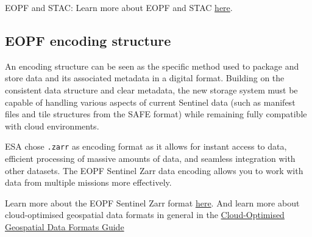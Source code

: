 \documentclass[
  letterpaper,
  DIV=11,
  numbers=noendperiod]{scrreprt}
\begin{document}
\begin{tcolorbox}[enhanced jigsaw, coltitle=black, colback=white, leftrule=.75mm, colbacktitle=quarto-callout-note-color!10!white, titlerule=0mm, title=\textcolor{quarto-callout-note-color}{\faInfo}\hspace{0.5em}{Note}, rightrule=.15mm, bottomrule=.15mm, bottomtitle=1mm, toptitle=1mm, arc=.35mm, toprule=.15mm, left=2mm, opacityback=0, colframe=quarto-callout-note-color-frame, opacitybacktitle=0.6, breakable]

EOPF and STAC: Learn more about EOPF and STAC
\href{./31_stac_intro.qmd}{here}.

\end{tcolorbox}

\subsection{EOPF encoding structure}\label{eopf-encoding-structure}

An encoding structure can be seen as the specific method used to package
and store data and its associated metadata in a digital format. Building
on the consistent data structure and clear metadata, the new storage
system must be capable of handling various aspects of current Sentinel
data (such as manifest files and tile structures from the SAFE format)
while remaining fully compatible with cloud environments.

ESA chose \texttt{.zarr} as encoding format as it allows for instant
access to data, efficient processing of massive amounts of data, and
seamless integration with other datasets. The EOPF Sentinel Zarr data
encoding allows you to work with data from multiple missions more
effectively.

\begin{tcolorbox}[enhanced jigsaw, coltitle=black, colback=white, leftrule=.75mm, colbacktitle=quarto-callout-note-color!10!white, titlerule=0mm, title=\textcolor{quarto-callout-note-color}{\faInfo}\hspace{0.5em}{Note}, rightrule=.15mm, bottomrule=.15mm, bottomtitle=1mm, toptitle=1mm, arc=.35mm, toprule=.15mm, left=2mm, opacityback=0, colframe=quarto-callout-note-color-frame, opacitybacktitle=0.6, breakable]

Learn more about the EOPF Sentinel Zarr format
\href{https://zarr.eopf.copernicus.eu/}{here}. And learn more about
cloud-optimised geospatial data formats in general in the
\href{https://guide.cloudnativegeo.org/}{Cloud-Optimised Geospatial Data
Formats Guide}

\end{tcolorbox}
\end{document}

